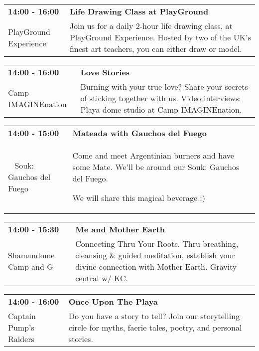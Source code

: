 \begin{tabular}{ p{1in} p{2.2in} }
    \textbf{14:00 - 16:00} & \textbf{Life Drawing Class at PlayGround} \\
    PlayGround Experience \newline  & Join us for a daily 2-hour life drawing class, at PlayGround Experience. Hosted by two of the UK's finest art teachers, you can either draw or model. \\
    \hline 
\end{tabular}
    
\begin{tabular}{ p{1in} p{2.2in} }
    \textbf{14:00 - 16:00} & \textbf{Love Stories} \\
    Camp IMAGINEnation \newline  & Burning with your true love? Share your secrets of sticking together with us. Video interviews: Playa dome studio at Camp IMAGINEnation. \\
    \hline 
\end{tabular}
    
\begin{tabular}{ p{1in} p{2.2in} }
    \textbf{14:00 - 15:00} & \textbf{Mateada with Gauchos del Fuego} \\
    ~ \newline Souk: Gauchos del Fuego & Come and meet Argentinian burners and have some Mate. We'll be around our Souk: Gauchos del Fuego.

We will share this magical beverage :) \\
    \hline 
\end{tabular}
    
\begin{tabular}{ p{1in} p{2.2in} }
    \textbf{14:00 - 15:30} & \textbf{Me and Mother Earth} \\
    Shamandome Camp \newline 615 and G & Connecting Thru Your Roots. Thru breathing, cleansing \& guided meditation, establish your divine connection with Mother Earth. Gravity central
w/ KC. \\
    \hline 
\end{tabular}
    
\begin{tabular}{ p{1in} p{2.2in} }
    \textbf{14:00 - 16:00} & \textbf{Once Upon The Playa} \\
    Captain Pump's Raiders \newline  & Do you have a story to tell? Join our storytelling circle for myths, faerie tales, poetry, and personal stories. \\
    \hline 
\end{tabular}
    

